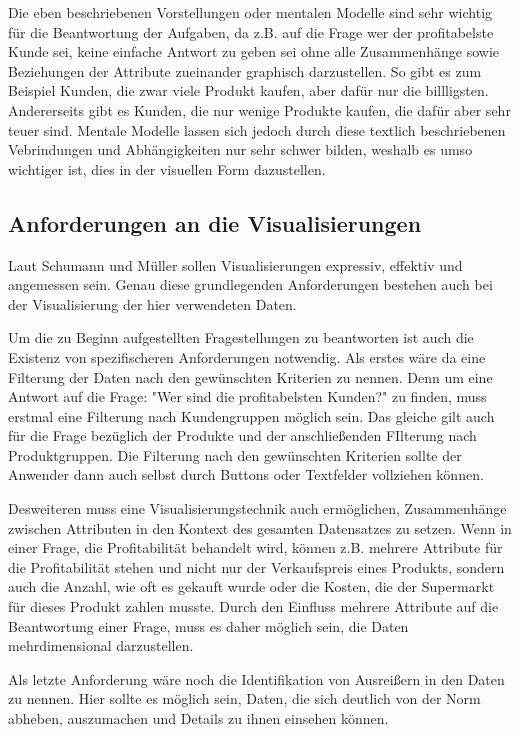 \documentclass[usegeometry=true]{scrartcl}
\begin{document}
\noindent Die eben beschriebenen Vorstellungen oder mentalen Modelle sind sehr wichtig für die Beantwortung der Aufgaben, da z.B. auf die Frage wer der profitabelste Kunde sei,
keine einfache Antwort zu geben sei ohne alle Zusammenhänge sowie Beziehungen der Attribute zueinander graphisch darzustellen. So gibt es zum Beispiel Kunden, die zwar viele
Produkt kaufen, aber dafür nur die billligsten. Andererseits gibt es Kunden, die nur wenige Produkte kaufen, die dafür aber sehr teuer sind. Mentale Modelle lassen sich jedoch
durch diese textlich beschriebenen Vebrindungen und Abhängigkeiten nur sehr schwer bilden, weshalb es umso wichtiger ist, dies in der visuellen Form dazustellen.

\subsection{Anforderungen an die Visualisierungen}\label{Anforderung}
Laut Schumann und Müller sollen Visualisierungen expressiv, effektiv und angemessen sein. \cite[9]{schumann2013visualisierung} Genau diese grundlegenden Anforderungen bestehen
auch bei der Visualisierung der hier verwendeten Daten.

\noindent Um die zu Beginn aufgestellten Fragestellungen zu beantworten ist auch die Existenz von spezifischeren Anforderungen notwendig. Als erstes wäre da eine Filterung der
Daten nach den gewünschten Kriterien zu nennen. Denn um eine Antwort auf die Frage: "Wer sind die profitabelsten Kunden?" zu finden, muss erstmal eine Filterung nach Kundengruppen
möglich sein. Das gleiche gilt auch für die Frage bezüglich der Produkte und der anschließenden FIlterung nach Produktgruppen. Die Filterung nach den gewünschten Kriterien
sollte der Anwender dann auch selbst durch Buttons oder Textfelder vollziehen können.

\noindent Desweiteren muss eine Visualisierungstechnik auch ermöglichen, Zusammenhänge zwischen Attributen in den Kontext des gesamten Datensatzes zu setzen. Wenn in einer Frage,
die Profitabilität behandelt wird, können z.B. mehrere Attribute für die Profitabilität stehen und nicht nur der Verkaufspreis eines Produkts, sondern auch die
Anzahl, wie oft es gekauft wurde oder die Kosten, die der Supermarkt für dieses Produkt zahlen musste. Durch den Einfluss mehrere Attribute auf die Beantwortung einer Frage, muss
es daher möglich sein, die Daten mehrdimensional darzustellen.

\noindent Als letzte Anforderung wäre noch die Identifikation von Ausreißern in den Daten zu nennen. Hier sollte es möglich sein, Daten, die sich deutlich von der Norm abheben,
auszumachen und Details zu ihnen einsehen können.
\end{document}
